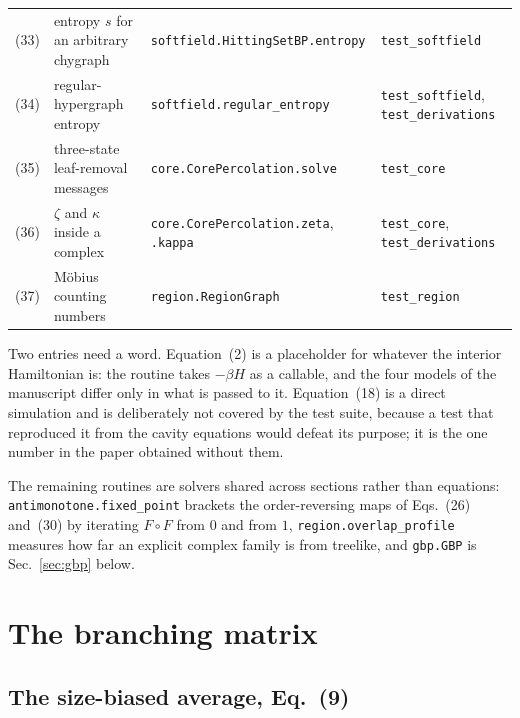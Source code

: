\documentclass[aps,pre,onecolumn,superscriptaddress,floatfix,nofootinbib]{revtex4-2}
\newcommand{\code}[1]{\texttt{#1}}
\begin{document}
{\begin{longtable}{@{}r L{0.29\textwidth} L{0.37\textwidth} L{0.17\textwidth}@{}}
(33) & entropy $s$ for an arbitrary chygraph & \code{softfield.HittingSetBP.entropy} & \code{test\_softfield} \\
(34) & regular-hypergraph entropy & \code{softfield.regular\_entropy} & \code{test\_softfield}, \code{test\_derivations} \\
(35) & three-state leaf-removal messages & \code{core.CorePercolation.solve} & \code{test\_core} \\
(36) & $\zeta$ and $\kappa$ inside a complex & \code{core.CorePercolation.zeta}, \code{.kappa} & \code{test\_core}, \code{test\_derivations} \\
(37) & M\"obius counting numbers & \code{region.RegionGraph} & \code{test\_region} \\
\end{longtable}
}

Two entries need a word. Equation~(2) is a placeholder for whatever the
interior Hamiltonian is: the routine takes $-\beta H$ as a callable, and the
four models of the manuscript differ only in what is passed to it.
Equation~(18) is a direct simulation and is deliberately not covered by the test
suite, because a test that reproduced it from the cavity equations would defeat
its purpose; it is the one number in the paper obtained without them.

The remaining routines are solvers shared across sections rather than
equations: \code{antimonotone.fixed\_point} brackets the order-reversing maps of
Eqs.~(26) and~(30) by iterating $F\circ F$ from $0$ and from $1$,
\code{region.overlap\_profile} measures how far an explicit complex family is
from treelike, and \code{gbp.GBP} is Sec.~\ref{sec:gbp} below.

\section{The branching matrix}
\label{sec:branching}

\subsection{The size-biased average, Eq.~(9)}
\end{document}
